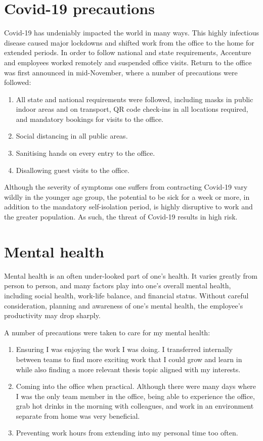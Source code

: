 \section{Covid-19 precautions}
Covid-19 has undeniably impacted the world in many ways. This highly infectious disease caused major lockdowns and shifted work from the office to the home for extended periods. In order to follow national and state requirements, Accenture and employees worked remotely and suspended office visits. Return to the office was first announced in mid-November, where a number of precautions were followed:

\begin{enumerate}
  \item All state and national requirements were followed, including masks in public indoor areas and on transport, QR code check-ins in all locations required, and mandatory bookings for visits to the office.
  \item Social distancing in all public areas. 
  \item Sanitising hands on every entry to the office.
  \item Disallowing guest visits to the office. 
\end{enumerate}

Although the severity of symptoms one suffers from contracting Covid-19 vary wildly in the younger age group, the potential to be sick for a week or more, in addition to the mandatory self-isolation period, is highly disruptive to work and the greater population. As such, the threat of Covid-19 results in high risk. 


\section{Mental health}
Mental health is an often under-looked part of one's health. It varies greatly from person to person, and many factors play into one's overall mental health, including social health, work-life balance, and financial status. Without careful consideration, planning and awareness of one's mental health, the employee's productivity may drop sharply. 

A number of precautions were taken to care for my mental health:
\begin{enumerate}
  \item Ensuring I was enjoying the work I was doing. I transferred internally between teams to find more exciting work that I could grow and learn in while also finding a more relevant thesis topic aligned with my interests. 
  \item Coming into the office when practical. Although there were many days where I was the only team member in the office, being able to experience the office, grab hot drinks in the morning with colleagues, and work in an environment separate from home was very beneficial.
  \item Preventing work hours from extending into my personal time too often. 
\end{enumerate}

